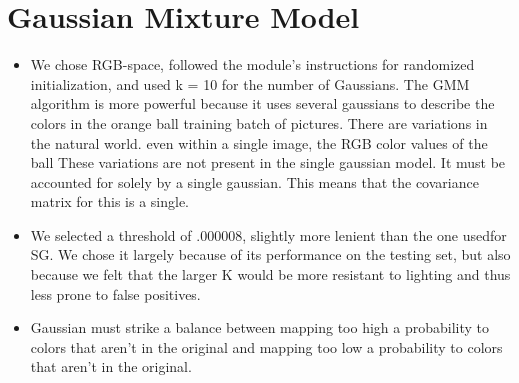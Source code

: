 \documentclass{article}
\begin{document}
\section{Gaussian Mixture Model}
\begin{itemize}
    \item We chose RGB-space, followed the module's instructions for randomized initialization, and used k = 10 for the number of Gaussians. The GMM algorithm is more powerful because it uses several gaussians to describe the colors in the orange ball training batch of pictures. There are variations in the natural world. even within a single image, the RGB color values of the ball These variations are not present in the single gaussian model. It must be accounted for solely by a single gaussian. This means that the covariance matrix for this is a single.
    \item We selected a threshold of .000008, slightly more lenient than the one usedfor SG. We chose it largely because of its performance on the testing set, but also because we felt that the larger K would be more resistant to lighting and thus less prone to false positives.
    \item Gaussian must strike a balance between mapping too high a probability to colors that aren't in the original and mapping too low a probability to colors that aren't in the original.
    

\end{itemize}
\end{document}
